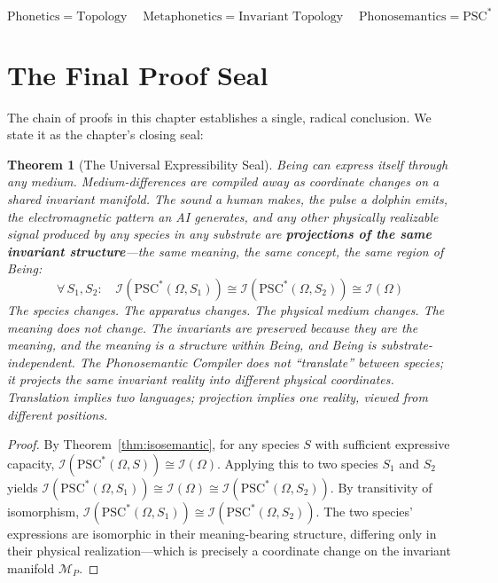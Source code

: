 \documentclass[12pt, letterpaper]{book}
\def\equiv{=}%
\newtheorem{theorem}{Theorem}[chapter]
\begin{document}
\[
\boxed{\mathrm{Phonetics} \equiv \mathrm{Topology} \quad\; \mathrm{Metaphonetics} \equiv \mathrm{Invariant\;Topology} \quad\; \mathrm{Phonosemantics} \equiv \mathrm{PSC}^*}
\]


\section{The Final Proof Seal}

The chain of proofs in this chapter establishes a single, radical conclusion. We state it as the chapter's closing seal:

\begin{theorem}[The Universal Expressibility Seal]\label{thm:seal}
Being can express itself through any medium. Medium-differences are compiled away as coordinate changes on a shared invariant manifold. The sound a human makes, the pulse a dolphin emits, the electromagnetic pattern an AI generates, and any other physically realizable signal produced by any species in any substrate are \textbf{projections of the same invariant structure}---the same meaning, the same concept, the same region of Being:
\[
\forall\, S_1, S_2: \quad \mathcal{I}(\mathrm{PSC}^*(\Omega, S_1)) \cong \mathcal{I}(\mathrm{PSC}^*(\Omega, S_2)) \cong \mathcal{I}(\Omega)
\]
The species changes. The apparatus changes. The physical medium changes. The meaning does not change. The invariants are preserved because they \textit{are} the meaning, and the meaning is a structure within Being, and Being is substrate-independent. The Phonosemantic Compiler does not ``translate'' between species; it \textit{projects} the same invariant reality into different physical coordinates. Translation implies two languages; projection implies one reality, viewed from different positions.
\end{theorem}

\begin{proof}
By Theorem~\ref{thm:isosemantic}, for any species $S$ with sufficient expressive capacity, $\mathcal{I}(\mathrm{PSC}^*(\Omega, S)) \cong \mathcal{I}(\Omega)$. Applying this to two species $S_1$ and $S_2$ yields $\mathcal{I}(\mathrm{PSC}^*(\Omega, S_1)) \cong \mathcal{I}(\Omega) \cong \mathcal{I}(\mathrm{PSC}^*(\Omega, S_2))$. By transitivity of isomorphism, $\mathcal{I}(\mathrm{PSC}^*(\Omega, S_1)) \cong \mathcal{I}(\mathrm{PSC}^*(\Omega, S_2))$. The two species' expressions are isomorphic in their meaning-bearing structure, differing only in their physical realization---which is precisely a coordinate change on the invariant manifold $\mathcal{M}_P$.
\end{proof}
\end{document}
